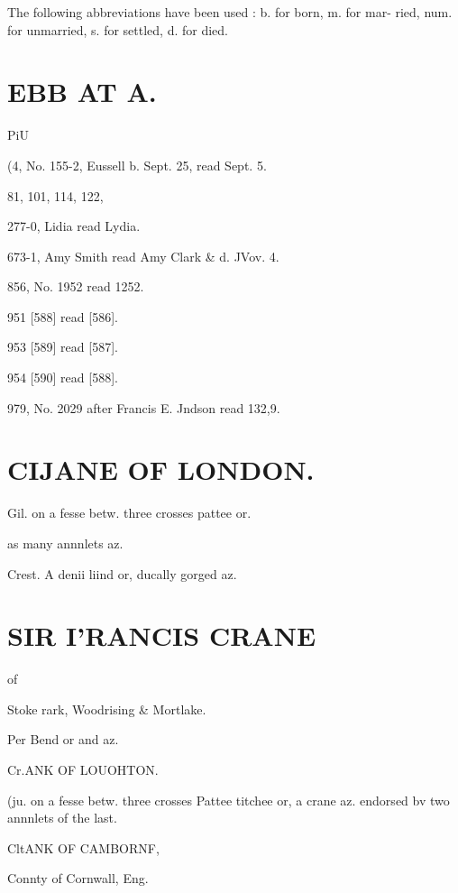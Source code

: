 \documentclass{book}
\begin{document}
The following abbreviations have been used : b. for born, m. for mar- 
ried, num. for unmarried, s. for settled, d. for died. 



\chapter{EBB AT A.}


PiU 



(4, No. 155-2, Eussell b. Sept. 25, read Sept. 5. 



81, 
101, 
114, 
122, 



277-0, Lidia read Lydia. 

673-1, Amy Smith read Amy Clark \& d. JVov. 4. 

856, No. 1952 read 1252. 

951 [588] read [586]. 

953 [589] read [587]. 

954 [590] read [588]. 

979, No. 2029 after Francis E. Jndson read 132,9. 





\chapter{CIJANE OF LONDON.}
Gil. on a fesse betw. three crosses pattee or. 

as many annnlets az. 

Crest. A denii liind or, ducally gorged az. 



\chapter{SIR I'RANCIS CRANE}
of 

Stoke rark, Woodrising \& Mortlake. 

Per Bend or and az. 





Cr.ANK OF LOUOHTON. 

(ju. on a fesse betw. three crosses 
Pattee titchee or, a crane az. endorsed 
bv two annnlets of the last. 



CltANK OF CAMBORNF, 

Connty of Cornwall, Eng. 
\end{document}
